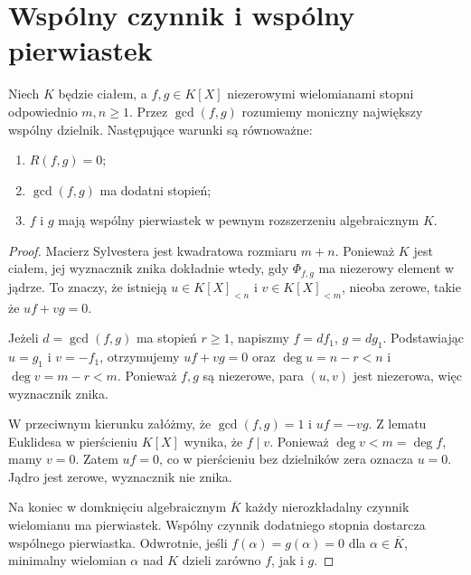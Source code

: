 \section{Wspólny czynnik i wspólny pierwiastek}
\begin{twierdzenie}\label{aa:tw:res-common}
Niech $K$ będzie ciałem, a $f,g\in K[X]$ niezerowymi wielomianami
stopni odpowiednio $m,n\ge1$. Przez $\gcd(f,g)$ rozumiemy
moniczny największy wspólny dzielnik. Następujące warunki są równoważne:
\begin{enumerate}
\item $R(f,g)=0$;
\item $\gcd(f,g)$ ma dodatni stopień;
\item $f$ i $g$ mają wspólny pierwiastek w pewnym rozszerzeniu algebraicznym $K$.
\end{enumerate}
\end{twierdzenie}
\begin{proof}
Macierz Sylvestera jest kwadratowa rozmiaru $m+n$. Ponieważ $K$
jest ciałem, jej wyznacznik znika dokładnie wtedy, gdy
$\Phi_{f,g}$ ma niezerowy element w jądrze. To znaczy, że
istnieją $u\in K[X]_{<n}$ i $v\in K[X]_{<m}$, nieoba zerowe,
takie że $uf+vg=0$.

Jeżeli $d=\gcd(f,g)$ ma stopień $r\ge1$, napiszmy $f=df_1$,
$g=dg_1$. Podstawiając $u=g_1$ i $v=-f_1$, otrzymujemy
$uf+vg=0$ oraz $\deg u=n-r<n$ i $\deg v=m-r<m$.
Ponieważ $f,g$ są niezerowe, para $(u,v)$ jest niezerowa,
więc wyznacznik znika.

W przeciwnym kierunku załóżmy, że $\gcd(f,g)=1$ i
$uf=-vg$. Z lematu Euklidesa w pierścieniu $K[X]$ wynika,
że $f\mid v$. Ponieważ $\deg v<m=\deg f$, mamy $v=0$.
Zatem $uf=0$, co w pierścieniu bez dzielników zera oznacza
$u=0$. Jądro jest zerowe, wyznacznik nie znika.

Na koniec w domknięciu algebraicznym $\overline K$ każdy
nierozkładalny czynnik wielomianu ma pierwiastek. Wspólny
czynnik dodatniego stopnia dostarcza wspólnego pierwiastka.
Odwrotnie, jeśli $f(\alpha)=g(\alpha)=0$ dla $\alpha\in\overline K$,
minimalny wielomian $\alpha$ nad $K$ dzieli zarówno $f$, jak i $g$.
\end{proof}

